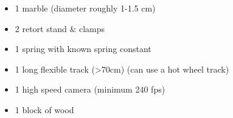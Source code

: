 \begin{itemize}
    \item 1 marble (diameter roughly 1-1.5 cm)
    \item 2 retort stand \& clamps
    \item 1 spring with known spring constant
    \item 1 long flexible track (>70cm) (can use a hot wheel track)
    \item 1 high speed camera (minimum 240 fps)
    \item 1 block of wood
\end{itemize}